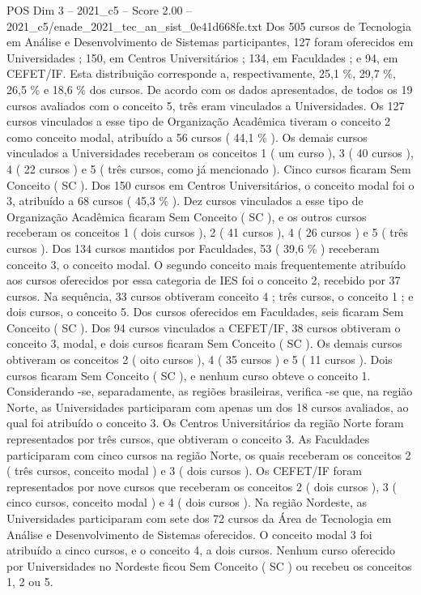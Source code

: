 \begin{textsample}{POS Dim 3 – 2021\_c5 – Score 2.00 – 2021\_c5/enade\_2021\_tec\_an\_sist\_0e41d668fe.txt}
Dos 505 cursos de Tecnologia em Análise e Desenvolvimento de Sistemas participantes, 127 foram oferecidos em Universidades ; 150, em Centros Universitários ; 134, em Faculdades ; e 94, em CEFET/IF.
Esta distribuição corresponde a, respectivamente, 25,1 \%, 29,7 \%, 26,5 \% e 18,6 \% dos cursos.
De acordo com os dados apresentados, de todos os 19 cursos avaliados com o conceito 5, três eram vinculados a Universidades.
Os 127 cursos vinculados a esse tipo de Organização Acadêmica tiveram o conceito 2 como conceito modal, atribuído a 56 cursos ( 44,1 \% ).
Os demais cursos vinculados a Universidades receberam os conceitos 1 ( um curso ), 3 ( 40 cursos ), 4 ( 22 cursos ) e 5 ( três cursos, como já mencionado ).
Cinco cursos ficaram Sem Conceito ( SC ).
Dos 150 cursos em Centros Universitários, o conceito modal foi o 3, atribuído a 68 cursos ( 45,3 \% ).
Dez cursos vinculados a esse tipo de Organização Acadêmica ficaram Sem Conceito ( SC ), e os outros cursos receberam os conceitos 1 ( dois cursos ), 2 ( 41 cursos ), 4 ( 26 cursos ) e 5 ( três cursos ).
Dos 134 cursos mantidos por Faculdades, 53 ( 39,6 \% ) receberam conceito 3, o conceito modal.
O segundo conceito mais frequentemente atribuído aos cursos oferecidos por essa categoria de IES foi o conceito 2, recebido por 37 cursos.
Na sequência, 33 cursos obtiveram conceito 4 ; três cursos, o conceito 1 ; e dois cursos, o conceito 5.
Dos cursos oferecidos em Faculdades, seis ficaram Sem Conceito ( SC ).
Dos 94 cursos vinculados a CEFET/IF, 38 cursos obtiveram o conceito 3, modal, e dois cursos ficaram Sem Conceito ( SC ).
Os demais cursos obtiveram os conceitos 2 ( oito cursos ), 4 ( 35 cursos ) e 5 ( 11 cursos ).
Dois cursos ficaram Sem Conceito ( SC ), e nenhum curso obteve o conceito 1.
Considerando -se, separadamente, as regiões brasileiras, verifica -se que, na região Norte, as Universidades participaram com apenas um dos 18 cursos avaliados, ao qual foi atribuído o conceito 3.
Os Centros Universitários da região Norte foram representados por três cursos, que obtiveram o conceito 3.
As Faculdades participaram com cinco cursos na região Norte, os quais receberam os conceitos 2 ( três cursos, conceito modal ) e 3 ( dois cursos ).
Os CEFET/IF foram representados por nove cursos que receberam os conceitos 2 ( dois cursos ), 3 ( cinco cursos, conceito modal ) e 4 ( dois cursos ).
Na região Nordeste, as Universidades participaram com sete dos 72 cursos da Área de Tecnologia em Análise e Desenvolvimento de Sistemas oferecidos.
O conceito modal 3 foi atribuído a cinco cursos, e o conceito 4, a dois cursos.
Nenhum curso oferecido por Universidades no Nordeste ficou Sem Conceito ( SC ) ou recebeu os conceitos 1, 2 ou 5.

\end{textsample}
